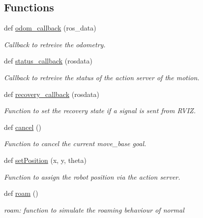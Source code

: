 \subsection*{Functions}
\begin{DoxyCompactItemize}
\item 
def \hyperlink{namespaceBehaviors_ab583cdd0339b053bae9c90edfa3ac54e}{odom\+\_\+callback} (ros\+\_\+data)
\begin{DoxyCompactList}\small\item\em Callback to retreive the odometry. \end{DoxyCompactList}\item 
def \hyperlink{namespaceBehaviors_a90e1204c5a8da2ddecfa10a3341445a2}{status\+\_\+callback} (rosdata)
\begin{DoxyCompactList}\small\item\em Callback to retreive the status of the action server of the motion. \end{DoxyCompactList}\item 
def \hyperlink{namespaceBehaviors_a28e96174292117b887235e69fca82ca5}{recovery\+\_\+callback} (rosdata)
\begin{DoxyCompactList}\small\item\em Function to set the recovery state if a signal is sent from R\+V\+IZ. \end{DoxyCompactList}\item 
def \hyperlink{namespaceBehaviors_a7cc21a6fee5a1d2a1139df067ef86299}{cancel} ()
\begin{DoxyCompactList}\small\item\em Function to cancel the current move\+\_\+base goal. \end{DoxyCompactList}\item 
def \hyperlink{namespaceBehaviors_a7cc66788be2327e620e1093febba1bcd}{set\+Position} (x, y, theta)
\begin{DoxyCompactList}\small\item\em Function to assign the robot position via the action server. \end{DoxyCompactList}\item 
def \hyperlink{namespaceBehaviors_a8c0daf846b80162d86c3e45a605579be}{roam} ()
\begin{DoxyCompactList}\small\item\em roam\+: function to simulate the roaming behaviour of normal \end{DoxyCompactList}\end{DoxyCompactItemize}
